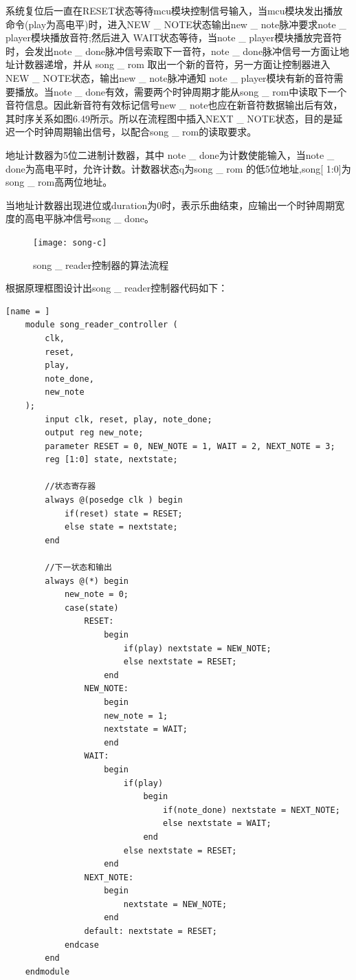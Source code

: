 \documentclass{../source/Experiment}
\begin{document}
                系统复位后一直在RESET状态等待mcu模块控制信号输入，当mcu模块发出播放命令(play为高电平)时，进入NEW \_ NOTE状态输出new \_ note脉冲要求note \_ player模块播放音符;然后进入 WAIT状态等待，当note \_ player模块播放完音符时，会发出note \_ done脉冲信号索取下一音符，note \_ done脉冲信号一方面让地址计数器递增，并从 song \_ rom 取出一个新的音符，另一方面让控制器进入NEW \_ NOTE状态，输出new \_ note脉冲通知 note \_ player模块有新的音符需要播放。当note \_ done有效，需要两个时钟周期才能从song \_ rom中读取下一个音符信息。因此新音符有效标记信号new \_ note也应在新音符数据输出后有效，其时序关系如图6.49所示。所以在流程图中插入NEXT \_ NOTE状态，目的是延迟一个时钟周期输出信号，以配合song \_ rom的读取要求。

                地址计数器为5位二进制计数器，其中 note \_ done为计数使能输入，当note \_ done为高电平时，允许计数。计数器状态q为song \_ rom 的低5位地址,song[ 1:0]为song  \_ rom高两位地址。
                
                当地址计数器出现进位或duration为0时，表示乐曲结束，应输出一个时钟周期宽度的高电平脉冲信号song \_ done。

                \begin{figure}[H]
                    \centering
                    \texttt{[image: song-c]}
                    \caption{song \_ reader控制器的算法流程}
                \end{figure}

                根据原理框图设计出song \_ reader控制器代码如下：
                \begin{lstlisting}[name = ]
    module song_reader_controller (
        clk, 
        reset, 
        play, 
        note_done, 
        new_note
    );
        input clk, reset, play, note_done;
        output reg new_note;
        parameter RESET = 0, NEW_NOTE = 1, WAIT = 2, NEXT_NOTE = 3;
        reg [1:0] state, nextstate;

        //状态寄存器
        always @(posedge clk ) begin
            if(reset) state = RESET;
            else state = nextstate;
        end

        //下一状态和输出
        always @(*) begin
            new_note = 0;
            case(state)
                RESET:
                    begin
                        if(play) nextstate = NEW_NOTE;
                        else nextstate = RESET;
                    end
                NEW_NOTE:
                    begin
                    new_note = 1;
                    nextstate = WAIT; 
                    end
                WAIT:
                    begin
                        if(play) 
                            begin
                                if(note_done) nextstate = NEXT_NOTE;
                                else nextstate = WAIT;
                            end
                        else nextstate = RESET;
                    end
                NEXT_NOTE:
                    begin
                        nextstate = NEW_NOTE;
                    end
                default: nextstate = RESET;
            endcase
        end
    endmodule
                \end{lstlisting}
\end{document}
